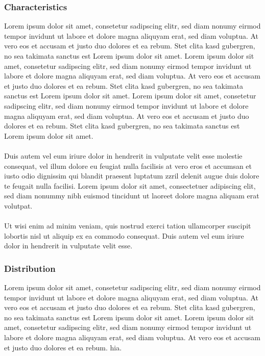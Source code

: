\subsubsection{Characteristics}
Lorem ipsum dolor sit amet, consetetur sadipscing elitr, sed diam nonumy eirmod tempor invidunt ut labore et dolore magna aliquyam erat, sed diam voluptua. At vero eos et accusam et justo duo dolores et ea rebum. Stet clita kasd gubergren, no sea takimata sanctus est Lorem ipsum dolor sit amet. Lorem ipsum dolor sit amet, consetetur sadipscing elitr, sed diam nonumy eirmod tempor invidunt ut labore et dolore magna aliquyam erat, sed diam voluptua. At vero eos et accusam et justo duo dolores et ea rebum. Stet clita kasd gubergren, no sea takimata sanctus est Lorem ipsum dolor sit amet. Lorem ipsum dolor sit amet, consetetur sadipscing elitr, sed diam nonumy eirmod tempor invidunt ut labore et dolore magna aliquyam erat, sed diam voluptua. At vero eos et accusam et justo duo dolores et ea rebum. Stet clita kasd gubergren, no sea takimata sanctus est Lorem ipsum dolor sit amet.  \\\\Duis autem vel eum iriure dolor in hendrerit in vulputate velit esse molestie consequat, vel illum dolore eu feugiat nulla facilisis at vero eros et accumsan et iusto odio dignissim qui blandit praesent luptatum zzril delenit augue duis dolore te feugait nulla facilisi. Lorem ipsum dolor sit amet, consectetuer adipiscing elit, sed diam nonummy nibh euismod tincidunt ut laoreet dolore magna aliquam erat volutpat.\\\\Ut wisi enim ad minim veniam, quis nostrud exerci tation ullamcorper suscipit lobortis nisl ut aliquip ex ea commodo consequat. Duis autem vel eum iriure dolor in hendrerit in vulputate velit esse.

\subsubsection{Distribution}
Lorem ipsum dolor sit amet, consetetur sadipscing elitr, sed diam nonumy eirmod tempor invidunt ut labore et dolore magna aliquyam erat, sed diam voluptua. At vero eos et accusam et justo duo dolores et ea rebum. Stet clita kasd gubergren, no sea takimata sanctus est Lorem ipsum dolor sit amet. Lorem ipsum dolor sit amet, consetetur sadipscing elitr, sed diam nonumy eirmod tempor invidunt ut labore et dolore magna aliquyam erat, sed diam voluptua. At vero eos et accusam et justo duo dolores et ea rebum.
hia. 

